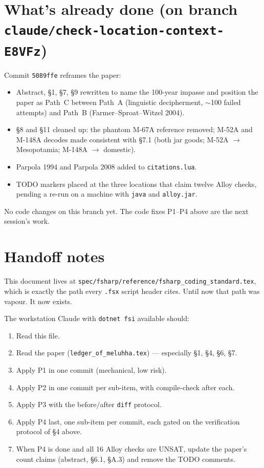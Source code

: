 \documentclass[11pt]{article}
\begin{document}
\section{What's already done (on branch \texttt{claude/check-location-context-E8VFz})}

Commit \texttt{5089ffe} reframes the paper:

\begin{itemize}[leftmargin=2em]
\item Abstract, \S1, \S7, \S9 rewritten to name the 100-year
  impasse and position the paper as Path~C between Path~A
  (linguistic decipherment, $\sim$100 failed attempts) and Path~B
  (Farmer--Sproat--Witzel 2004).
\item \S8 and \S11 cleaned up: the phantom M-67A reference
  removed; M-52A and M-148A decodes made consistent with \S7.1
  (both jar goods; M-52A $\to$ Mesopotamia; M-148A $\to$
  domestic).
\item Parpola 1994 and Parpola 2008 added to
  \texttt{citations.lua}.
\item TODO markers placed at the three locations that claim
  twelve Alloy checks, pending a re-run on a machine with
  \texttt{java} and \texttt{alloy.jar}.
\end{itemize}

No code changes on this branch yet.  The code fixes P1--P4
above are the next session's work.

\section{Handoff notes}

This document lives at
\texttt{spec/fsharp/reference/fsharp\_coding\_standard.tex},
which is exactly the path every \texttt{.fsx} script header
cites.  Until now that path was vapour.  It now exists.

The workstation Claude with \texttt{dotnet fsi} available
should:

\begin{enumerate}[leftmargin=2em]
\item Read this file.
\item Read the paper (\texttt{ledger\_of\_meluhha.tex}) ---
  especially \S1, \S4, \S6, \S7.
\item Apply P1 in one commit (mechanical, low risk).
\item Apply P2 in one commit per sub-item, with compile-check
  after each.
\item Apply P3 with the before/after \texttt{diff} protocol.
\item Apply P4 last, one sub-item per commit, each gated on the
  verification protocol of \S4 above.
\item When P4 is done and all 16 Alloy checks are UNSAT, update
  the paper's count claims (abstract, \S6.1, \S A.3) and remove
  the TODO comments.
\end{enumerate}
\end{document}
